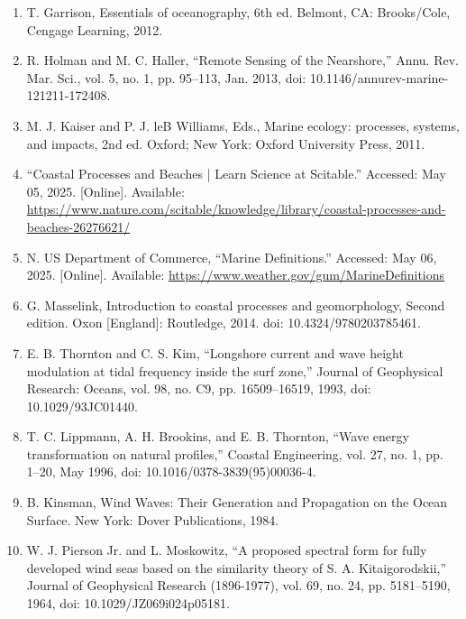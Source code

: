 \documentclass{article}
\begin{document}
\begin{sloppypar}
\begin{enumerate}
    \item{T. Garrison, Essentials of oceanography, 6th ed. Belmont, CA: Brooks/Cole, Cengage Learning, 2012.}

    \item{R. Holman and M. C. Haller, “Remote Sensing of the Nearshore,” Annu. Rev. Mar. Sci., vol. 5, no. 1, pp. 95–113, Jan. 2013, doi: 10.1146/annurev-marine-121211-172408.}

    \item{M. J. Kaiser and P. J. leB Williams, Eds., Marine ecology: processes, systems, and impacts, 2nd ed. Oxford; New York: Oxford University Press, 2011.}

    \item{“Coastal Processes and Beaches | Learn Science at Scitable.” Accessed: May 05, 2025. [Online]. Available: \url{https://www.nature.com/scitable/knowledge/library/coastal-processes-and-beaches-26276621/}}

    \item{N. US Department of Commerce, “Marine Definitions.” Accessed: May 06, 2025. [Online]. Available: \url{https://www.weather.gov/gum/MarineDefinitions}}

    \item{G. Masselink, Introduction to coastal processes and geomorphology, Second edition. Oxon [England]: Routledge, 2014. doi: 10.4324/9780203785461.}

    \item{E. B. Thornton and C. S. Kim, “Longshore current and wave height modulation at tidal frequency inside the surf zone,” Journal of Geophysical Research: Oceans, vol. 98, no. C9, pp. 16509–16519, 1993, doi: 10.1029/93JC01440.}

    \item{T. C. Lippmann, A. H. Brookins, and E. B. Thornton, “Wave energy transformation on natural profiles,” Coastal Engineering, vol. 27, no. 1, pp. 1–20, May 1996, doi: 10.1016/0378-3839(95)00036-4.}

    \item{B. Kinsman, Wind Waves: Their Generation and Propagation on the Ocean Surface. New York: Dover Publications, 1984.}

    \item{W. J. Pierson Jr. and L. Moskowitz, “A proposed spectral form for fully developed wind seas based on the similarity theory of S. A. Kitaigorodskii,” Journal of Geophysical Research (1896-1977), vol. 69, no. 24, pp. 5181–5190, 1964, doi: 10.1029/JZ069i024p05181.}


\end{enumerate}
\end{sloppypar}
\end{document}

